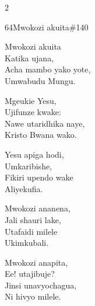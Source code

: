 \begin{multicols}{2}
\begin{hymn}{64}{Mwokozi akuita}{\#140}
\begin{stanza}
Mwokozi akuita\\
Katika ujana,\\
Acha mambo yako yote,\\
Umwabudu Mungu.
\end{stanza}
\begin{chorus}
Mgeukie Yesu,\\
Ujifunze kwake:\\
Nawe utaridhika naye,\\
Kristo Bwana wako.
\end{chorus}
\begin{stanza}
Yesu apiga hodi,\\
Umkaribishe,\\
Fikiri upendo wake\\
Aliyekufia.
\end{stanza}
\begin{stanza}
Mwokozi ananena,\\
Jali shauri lake,\\
Utafaidi milele\\
Ukimkubali.
\end{stanza}
\begin{stanza}
Mwokozi anapita,\\
Ee! utajibuje?\\
Jinsi unavyochagua,\\
Ni hivyo milele.
\end{stanza}
\end{hymn}


\end{multicols}
